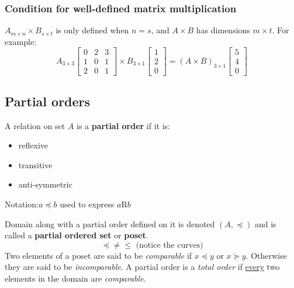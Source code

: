 \subsubsection*{Condition for well-defined matrix multiplication}
$A_{m \times n} \times B_{s \times t}$ is only defined when $n = s$, and $A \times B$ has dimensions $m \times t$.
For example:
\[
  A_{3 \times 3}
  \begin{bmatrix}
    0 & 2 & 3 \\
    1 & 0 & 1 \\
    2 & 0 & 1
  \end{bmatrix}
  \times
  B_{3 \times 1}
  \begin{bmatrix}
    1 \\
    2 \\
    0
  \end{bmatrix}
  =
  (A \times B)_{3 \times 1}
  \begin{bmatrix}
    5 \\
    4 \\
    0
  \end{bmatrix}
\]

\subsection{Partial orders}

A relation on set $A$ is a \textbf{partial order} if it is:
\begin{itemize}
  \item reflexive
  \item transitive
  \item anti-symmetric
\end{itemize}
Notation:\quad $a \preceq b$ used to express $a$R$b$

Domain along with a partial order defined on it is denoted $(A, \preceq)$
and is called a \textbf{partial ordered set} or \textbf{poset}.
\[
  \preceq \not = \leq \text{ (notice the curves)}
\]
Two elements of a poset are said to be \textit{comparable} if $x \preceq y$ or $x \succeq y$.
Otherwise they are said to be \textit{incomparable}.
A partial order is a \textit{total order} if \underline{every} two elements in the domain are \textit{comparable}.

